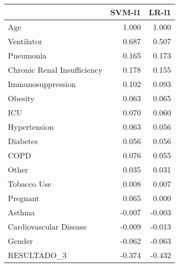 \begin{tabular}{lrr}
\toprule
{} &  SVM-l1 &  LR-l1 \\
\midrule
Age                         &   1.000 &  1.000 \\
Ventilator                  &   0.687 &  0.507 \\
Pneumonia                   &   0.165 &  0.173 \\
Chronic Renal Insufficiency &   0.178 &  0.155 \\
Immunosuppression           &   0.102 &  0.093 \\
Obesity                     &   0.063 &  0.065 \\
ICU                         &   0.070 &  0.060 \\
Hypertension                &   0.063 &  0.056 \\
Diabetes                    &   0.056 &  0.056 \\
COPD                        &   0.076 &  0.055 \\
Other                       &   0.035 &  0.031 \\
Tobacco Use                 &   0.008 &  0.007 \\
Pregnant                    &   0.065 &  0.000 \\
Asthma                      &  -0.007 & -0.003 \\
Cardiovascular Disease      &  -0.009 & -0.013 \\
Gender                      &  -0.062 & -0.063 \\
RESULTADO\_3                 &  -0.374 & -0.432 \\
\bottomrule
\end{tabular}
